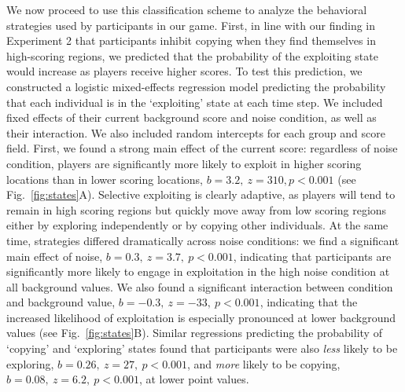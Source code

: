 \documentclass[12pt,letterpaper]{article}
\begin{document}
We now proceed to use this classification scheme to analyze the behavioral strategies used by participants in our game.
First, in line with our finding in Experiment 2 that participants inhibit copying when they find themselves in high-scoring regions, we predicted that the probability of the exploiting state would increase as players receive higher scores.  
To test this prediction, we constructed a logistic mixed-effects regression model predicting the probability that each individual is in the `exploiting' state at each time step. 
We included fixed effects of their current background score and noise condition, as well as their interaction.
We also included random intercepts for each group and score field.
First, we found a strong main effect of the current score: regardless of noise condition, players are significantly more likely to exploit in higher scoring locations than in lower scoring locations, $b=3.2,~z=310,p<0.001$  (see Fig.~\ref{fig:states}A).
Selective exploiting is clearly adaptive, as players will tend to remain in high scoring regions but quickly move away from low scoring regions either by exploring independently or by copying other individuals.
At the same time, strategies differed dramatically across noise conditions: we find a significant main effect of noise, $b=0.3,~z=3.7,~p<0.001$, indicating that participants are significantly more likely to engage in exploitation in the high noise condition at all background values.
We also found a significant interaction between condition and background value, $b=-0.3,~z=-33,~p<0.001$, indicating that the increased likelihood of exploitation is especially pronounced at lower background values (see Fig.~\ref{fig:states}B).
Similar regressions predicting the probability of `copying' and `exploring' states found that participants were also \emph{less} likely to be exploring, $b=0.26,~z=27,~p<0.001$, and \emph{more} likely to be copying, $b=0.08,~z=6.2,~p<0.001$, at lower point values.
\end{document}
